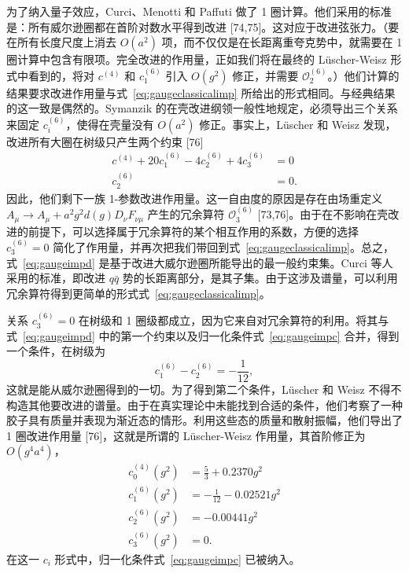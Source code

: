 为了纳入量子效应，Curci、Menotti 和 Paffuti 做了 1 圈计算。他们采用的标准是：所有威尔逊圈都在首阶对数水平得到改进 [74,75]。这对应于改进弦张力。（要在所有长度尺度上消去 $O(a^2)$ 项，而不仅仅是在长距离重夸克势中，就需要在 1 圈计算中包含有限项。完全改进的作用量，正如我们将在最终的 L\"uscher-Weisz 形式中看到的，将对 $c^{(4)}$ 和 $c_1^{(6)}$ 引入 $O(g^2)$ 修正，并需要 $\mathcal{O}_2^{(6)}$。）他们计算的结果要求改进作用量与式~\ref{eq:gaugeclassicalimp} 所给出的形式相同。与经典结果的这一致是偶然的。Symanzik 的在壳改进纲领一般性地规定，必须导出三个关系来固定 $c_i^{(6)}$，使得在壳量没有 $O(a^2)$ 修正。事实上，L\"uscher 和 Weisz 发现，改进所有大圈在树级只产生两个约束 [76]
\begin{equation}
\begin{aligned}
c^{(4)} + 20c_1^{(6)} - 4c_2^{(6)} + 4c_3^{(6)} &= 0\\
c_2^{(6)} &= 0.
\end{aligned}
\label{eq:gaugeimpd}
\end{equation}
因此，他们剩下一族 1-参数改进作用量。这一自由度的原因是存在由场重定义
$A_\mu \to A_\mu + a^2g^2d(g)D_\nu F_{\nu\mu}$ 产生的冗余算符 $\mathcal{O}_3^{(6)}$ [73,76]。由于在不影响在壳改进的前提下，可以选择属于冗余算符的某个相互作用的系数，方便的选择 $c_3^{(6)} = 0$ 简化了作用量，并再次把我们带回到式~\ref{eq:gaugeclassicalimp}。总之，式~\ref{eq:gaugeimpd} 是基于改进大威尔逊圈所能导出的最一般约束集。Curci 等人采用的标准，即改进 $q\bar q$ 势的长距离部分，是其子集。由于这涉及谱量，可以利用冗余算符得到更简单的形式式~\ref{eq:gaugeclassicalimp}。

关系 $c_3^{(6)} = 0$ 在树级和 1 圈级都成立，因为它来自对冗余算符的利用。将其与式~\ref{eq:gaugeimpd} 中的第一个约束以及归一化条件式~\ref{eq:gaugeimpc} 合并，得到一个条件，在树级为
\begin{equation}
c_1^{(6)} - c_2^{(6)} = -\frac{1}{12},
\end{equation}
这就是能从威尔逊圈得到的一切。为了得到第二个条件，L\"uscher 和 Weisz 不得不构造其他要改进的谱量。由于在真实理论中未能找到合适的条件，他们考察了一种胶子具有质量并表现为渐近态的情形。利用这些态的质量和散射振幅，他们导出了 1 圈改进作用量 [76]，这就是所谓的 L\"uscher-Weisz 作用量，其首阶修正为 $O(g^4a^4)$，
\begin{equation}
\begin{aligned}
c_0^{(4)}(g^2) &= \frac{5}{3} + 0.2370g^2\\
c_1^{(6)}(g^2) &= -\frac{1}{12} - 0.02521g^2\\
c_2^{(6)}(g^2) &= -0.00441g^2\\
c_3^{(6)}(g^2) &= 0.
\end{aligned}
\end{equation}
在这一 $c_i$ 形式中，归一化条件式~\ref{eq:gaugeimpc} 已被纳入。

